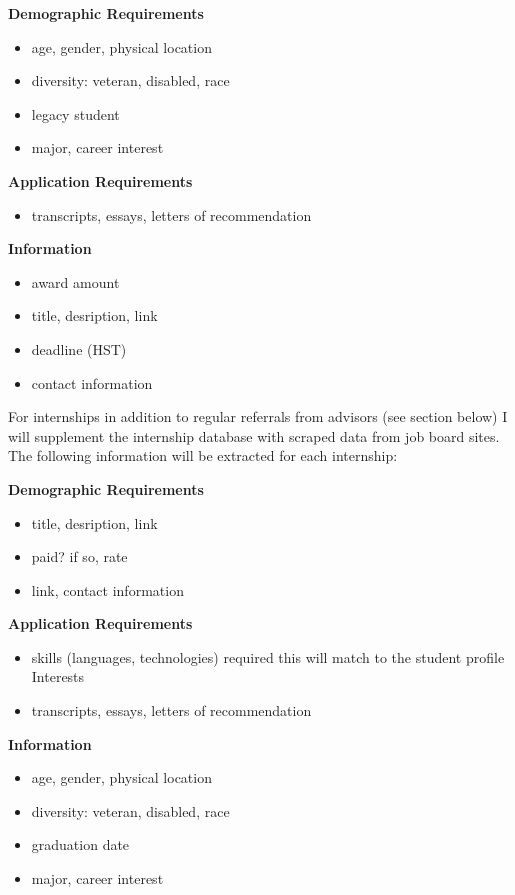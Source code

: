 \documentclass[english]{proposalnsf}
\begin{document}
		\textbf{Demographic Requirements}
		\begin{itemize}
			\item age, gender, physical location
			\item diversity: veteran, disabled, race
			\item legacy student
			\item major, career interest
		\end{itemize}
	
			\textbf{Application Requirements}
		\begin{itemize}
			\item transcripts, essays, letters of recommendation
		\end{itemize}
		
		\textbf{Information}
		\begin{itemize}
			\item award amount
			\item title, desription, link
			\item deadline (HST)
			\item contact information
		\end{itemize}
		
		
		For internships in addition to regular referrals from advisors (see section below) I will supplement the internship database with scraped data from job board sites. The following information will be extracted for each internship:
		
		\textbf{Demographic Requirements}
		\begin{itemize}
			\item title, desription, link
			\item paid? if so, rate
			\item link, contact information
		\end{itemize}
		
		\textbf{Application Requirements}
		\begin{itemize}
			\item skills (languages, technologies) required
			\subitem this will match to the student profile Interests
			\item transcripts, essays, letters of recommendation
		\end{itemize}
	
		\textbf{Information}
		\begin{itemize}
			\item age, gender, physical location
			\item diversity: veteran, disabled, race
			\item graduation date
			\item major, career interest
		\end{itemize}
		
\end{document}
